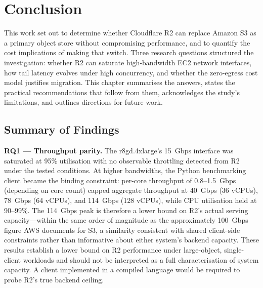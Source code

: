 
\chapter{Conclusion}\label{chapter:conclusion}

This work set out to determine whether Cloudflare R2 can replace Amazon S3 as a primary object store without compromising performance, and to quantify the cost implications of making that switch. Three research questions structured the investigation: whether R2 can saturate high-bandwidth EC2 network interfaces, how tail latency evolves under high concurrency, and whether the zero-egress cost model justifies migration. This chapter summarises the answers, states the practical recommendations that follow from them, acknowledges the study's limitations, and outlines directions for future work.

\section{Summary of Findings}

\textbf{RQ1 --- Throughput parity.} The r8gd.4xlarge's 15~Gbps interface was saturated at 95\% utilisation with no observable throttling detected from R2 under the tested conditions. At higher bandwidths, the Python benchmarking client became the binding constraint: per-core throughput of 0.8--1.5~Gbps (depending on core count) capped aggregate throughput at 40~Gbps (36 vCPUs), 78~Gbps (64 vCPUs), and 114~Gbps (128 vCPUs), while CPU utilisation held at 90--99\%. The 114~Gbps peak is therefore a lower bound on R2's actual serving capacity---within the same order of magnitude as the approximately 100~Gbps figure AWS documents for S3, a similarity consistent with shared client-side constraints rather than informative about either system's backend capacity. These results establish a lower bound on R2 performance under large-object, single-client workloads and should not be interpreted as a full characterisation of system capacity. A client implemented in a compiled language would be required to probe R2's true backend ceiling.

